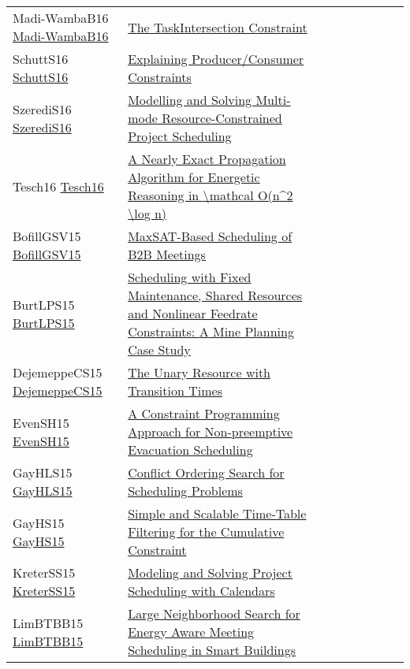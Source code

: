 {\begin{longtable}{p{3cm}p{7cm}lllllll}
Madi-WambaB16 \href{https://doi.org/10.1007/978-3-319-33954-2\_18}{Madi-WambaB16} &  \href{papers/Madi-WambaB16.pdf}{The TaskIntersection Constraint} &  &  &  &  &  &  & \\
SchuttS16 \href{https://doi.org/10.1007/978-3-319-44953-1\_28}{SchuttS16} &  \href{papers/SchuttS16.pdf}{Explaining Producer/Consumer Constraints} &  &  &  &  &  &  & \\
SzerediS16 \href{https://doi.org/10.1007/978-3-319-44953-1\_31}{SzerediS16} &  \href{papers/SzerediS16.pdf}{Modelling and Solving Multi-mode Resource-Constrained Project Scheduling} &  &  &  &  &  &  & \\
Tesch16 \href{https://doi.org/10.1007/978-3-319-44953-1\_32}{Tesch16} &  \href{papers/Tesch16.pdf}{A Nearly Exact Propagation Algorithm for Energetic Reasoning in {\textbackslash}mathcal O(n{\^{}}2 {\textbackslash}log n)} &  &  &  &  &  &  & \\
BofillGSV15 \href{https://doi.org/10.1007/978-3-319-18008-3\_5}{BofillGSV15} &  \href{papers/BofillGSV15.pdf}{MaxSAT-Based Scheduling of {B2B} Meetings} &  &  &  &  &  &  & \\
BurtLPS15 \href{https://doi.org/10.1007/978-3-319-18008-3\_7}{BurtLPS15} &  \href{papers/BurtLPS15.pdf}{Scheduling with Fixed Maintenance, Shared Resources and Nonlinear Feedrate Constraints: {A} Mine Planning Case Study} &  &  &  &  &  &  & \\
DejemeppeCS15 \href{https://doi.org/10.1007/978-3-319-23219-5\_7}{DejemeppeCS15} &  \href{papers/DejemeppeCS15.pdf}{The Unary Resource with Transition Times} &  &  &  &  &  &  & \\
EvenSH15 \href{https://doi.org/10.1007/978-3-319-23219-5\_40}{EvenSH15} &  \href{papers/EvenSH15.pdf}{A Constraint Programming Approach for Non-preemptive Evacuation Scheduling} &  &  &  &  &  &  & \\
GayHLS15 \href{https://doi.org/10.1007/978-3-319-23219-5\_10}{GayHLS15} &  \href{papers/GayHLS15.pdf}{Conflict Ordering Search for Scheduling Problems} &  &  &  &  &  &  & \\
GayHS15 \href{https://doi.org/10.1007/978-3-319-23219-5\_11}{GayHS15} &  \href{papers/GayHS15.pdf}{Simple and Scalable Time-Table Filtering for the Cumulative Constraint} &  &  &  &  &  &  & \\
KreterSS15 \href{https://doi.org/10.1007/978-3-319-23219-5\_19}{KreterSS15} &  \href{papers/KreterSS15.pdf}{Modeling and Solving Project Scheduling with Calendars} &  &  &  &  &  &  & \\
LimBTBB15 \href{https://doi.org/10.1007/978-3-319-18008-3\_17}{LimBTBB15} &  \href{papers/LimBTBB15.pdf}{Large Neighborhood Search for Energy Aware Meeting Scheduling in Smart Buildings} &  &  &  &  &  &  & \\

\end{longtable}}
